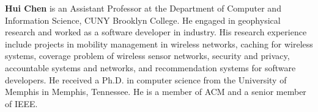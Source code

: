 \noindent \textbf{Hui Chen} is an Assistant Professor at the Department of
Computer and Information Science, CUNY Brooklyn College.  He engaged in
geophysical research and worked as a software developer in industry.  His
research experience include projects in mobility management in wireless
networks, caching for wireless systems, coverage problem of wireless sensor
networks, security and privacy, accountable systems and networks, and recommendation systems for
software developers.  He received a Ph.D. in computer science from the
University of Memphis in Memphis, Tennessee.  He is a member of ACM and a
senior member of IEEE. 